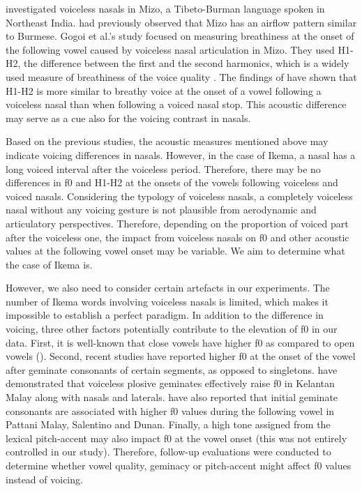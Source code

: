 \documentclass[output=paper]{langscibook}
\begin{document}
\citet{GogoiEtAl2018} investigated voiceless nasals in Mizo, a Tibeto-Burman language spoken in Northeast India. \citet{BhaskararaoLadefoged1991} had previously observed that Mizo has an airflow pattern similar to Burmese. Gogoi et al.’s study focused on measuring breathiness at the onset of the following vowel caused by voiceless nasal articulation in Mizo. They used H1-H2, the difference between the first and the second harmonics, which is a widely used measure of breathiness of the voice quality \citep{Johnson1997}. The findings of \citet{GogoiEtAl2018} have shown that H1-H2 is more similar to breathy voice at the onset of a vowel following a voiceless nasal than when following a voiced nasal stop. This acoustic difference may serve as a cue also for the voicing contrast in nasals.

Based on the previous studies, the acoustic measures mentioned above may indicate voicing differences in nasals. However, in the case of Ikema, a nasal has a long voiced interval after the voiceless period. Therefore, there may be no differences in f0 and H1-H2 at the onsets of the vowels following voiceless and voiced nasals. Considering the typology of voiceless nasals, a completely voiceless nasal without any voicing gesture is not plausible from aerodynamic and articulatory perspectives. Therefore, depending on the proportion of voiced part after the voiceless one, the impact from voiceless nasals on f0 and other acoustic values at the following vowel onset may be variable. We aim to determine what the case of Ikema is.

However, we also need to consider certain artefacts in our experiments. The number of Ikema words involving voiceless nasals is limited, which makes it impossible to establish a perfect paradigm. In addition to the difference in voicing, three other factors potentially contribute to the elevation of f0 in our data. First, it is well-known that close vowels have higher f0 as compared to open vowels (\citealt{WhalenLevitt1995}). Second, recent studies have reported higher f0 at the onset of the vowel after geminate consonants of certain segments, as opposed to singletons. \citet{HamzahEtAl2020} have demonstrated that voiceless plosive geminates effectively raise f0 in Kelantan Malay along with nasals and laterals. \citet{BurroniEtAl2021} have also reported that initial geminate consonants are associated with higher f0 values during the following vowel in Pattani Malay, Salentino and Dunan. Finally, a high tone assigned from the lexical pitch-accent may also impact f0 at the vowel onset (this was not entirely controlled in our study). Therefore, follow-up evaluations were conducted to determine whether vowel quality, geminacy or pitch-accent might affect f0 values instead of voicing.
\end{document}
